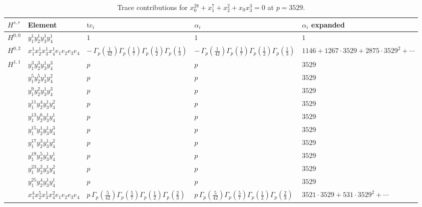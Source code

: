 \documentclass[11pt]{article}
\begin{document}
\begin{table}[ht]
\centering
\caption{Trace contributions for $x_0^{28} + x_1^{7} + x_2^{2} + x_0 x_3^{3} = 0$ at $p=3529$.}\label{tab:deformed-67}
\renewcommand{\arraystretch}{1.1}
{\scriptsize
\begin{tabular}{@{}lllll@{}}
\toprule
$H^{s,r}$ & Element & $\mathrm{tc}_i$ & $\alpha_i$ & $\alpha_i$ expanded \\
\midrule
$H^{0,0}$ & $y_{1}^{1} y_{2}^{1} y_{3}^{1} y_{4}^{1}$ & $1$ & $1$ & $1$ \\
\midrule
$H^{0,2}$ & $x_{1}^{1} x_{2}^{1} x_{3}^{1} x_{4}^{1}  e_{1} e_{2} e_{3} e_{4}$ & $- \, \Gamma_p \left( \frac{1}{42} \right) \Gamma_p \left( \frac{1}{7} \right) \Gamma_p \left( \frac{1}{2} \right) \Gamma_p \left( \frac{1}{3} \right)$ & $- \, \Gamma_p \left( \frac{1}{42} \right) \Gamma_p \left( \frac{1}{7} \right) \Gamma_p \left( \frac{1}{2} \right) \Gamma_p \left( \frac{1}{3} \right)$ & $1146{+}1267{\cdot}3529{+}2875{\cdot}3529^{2}{+}\cdots$ \\
\midrule
$H^{1,1}$ & $y_{1}^{3} y_{2}^{3} y_{3}^{1} y_{4}^{3}$ & $p \,$ & $p \,$ & $3529$ \\
 & $y_{1}^{5} y_{2}^{5} y_{3}^{1} y_{4}^{2}$ & $p \,$ & $p \,$ & $3529$ \\
 & $y_{1}^{9} y_{2}^{2} y_{3}^{1} y_{4}^{3}$ & $p \,$ & $p \,$ & $3529$ \\
 & $y_{1}^{11} y_{2}^{4} y_{3}^{1} y_{4}^{2}$ & $p \,$ & $p \,$ & $3529$ \\
 & $y_{1}^{13} y_{2}^{6} y_{3}^{1} y_{4}^{1}$ & $p \,$ & $p \,$ & $3529$ \\
 & $y_{1}^{15} y_{2}^{1} y_{3}^{1} y_{4}^{3}$ & $p \,$ & $p \,$ & $3529$ \\
 & $y_{1}^{17} y_{2}^{3} y_{3}^{1} y_{4}^{2}$ & $p \,$ & $p \,$ & $3529$ \\
 & $y_{1}^{19} y_{2}^{5} y_{3}^{1} y_{4}^{1}$ & $p \,$ & $p \,$ & $3529$ \\
 & $y_{1}^{23} y_{2}^{2} y_{3}^{1} y_{4}^{2}$ & $p \,$ & $p \,$ & $3529$ \\
 & $y_{1}^{25} y_{2}^{4} y_{3}^{1} y_{4}^{1}$ & $p \,$ & $p \,$ & $3529$ \\
 & $x_{1}^{4} x_{2}^{5} x_{3}^{1} x_{4}^{2}  e_{1} e_{2} e_{3} e_{4}$ & $p \, \Gamma_p \left( \frac{5}{42} \right) \Gamma_p \left( \frac{5}{7} \right) \Gamma_p \left( \frac{1}{2} \right) \Gamma_p \left( \frac{2}{3} \right)$ & $p \, \Gamma_p \left( \frac{5}{42} \right) \Gamma_p \left( \frac{5}{7} \right) \Gamma_p \left( \frac{1}{2} \right) \Gamma_p \left( \frac{2}{3} \right)$ & $3521{\cdot}3529{+}531{\cdot}3529^{2}{+}\cdots$ \\

\end{tabular}}
\end{table}
\end{document}
